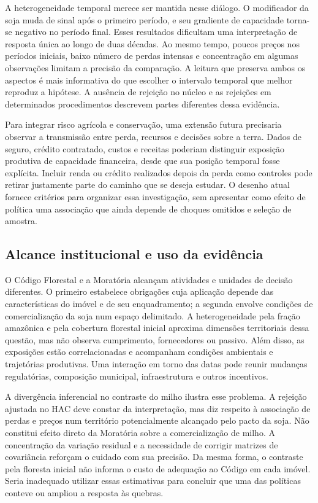 A heterogeneidade temporal merece ser mantida nesse diálogo. O modificador da soja muda de sinal após o primeiro período, e seu gradiente de capacidade torna-se negativo no período final. Esses resultados dificultam uma interpretação de resposta única ao longo de duas décadas. Ao mesmo tempo, poucos preços nos períodos iniciais, baixo número de perdas intensas e concentração em algumas observações limitam a precisão da comparação. A leitura que preserva ambos os aspectos é mais informativa do que escolher o intervalo temporal que melhor reproduz a hipótese. A ausência de rejeição no núcleo e as rejeições em determinados procedimentos descrevem partes diferentes dessa evidência.

Para integrar risco agrícola e conservação, uma extensão futura precisaria observar a transmissão entre perda, recursos e decisões sobre a terra. Dados de seguro, crédito contratado, custos e receitas poderiam distinguir exposição produtiva de capacidade financeira, desde que sua posição temporal fosse explícita. Incluir renda ou crédito realizados depois da perda como controles pode retirar justamente parte do caminho que se deseja estudar. O desenho atual fornece critérios para organizar essa investigação, sem apresentar como efeito de política uma associação que ainda depende de choques omitidos e seleção de amostra.

\subsection{Alcance institucional e uso da evidência}

O Código Florestal e a Moratória alcançam atividades e unidades de decisão diferentes. O primeiro estabelece obrigações cuja aplicação depende das características do imóvel e de seu enquadramento; a segunda envolve condições de comercialização da soja num espaço delimitado. A heterogeneidade pela fração amazônica e pela cobertura florestal inicial aproxima dimensões territoriais dessa questão, mas não observa cumprimento, fornecedores ou passivo. Além disso, as exposições estão correlacionadas e acompanham condições ambientais e trajetórias produtivas. Uma interação em torno das datas pode reunir mudanças regulatórias, composição municipal, infraestrutura e outros incentivos.

A divergência inferencial no contraste do milho ilustra esse problema. A rejeição ajustada no HAC deve constar da interpretação, mas diz respeito à associação de perdas e preços num território potencialmente alcançado pelo pacto da soja. Não constitui efeito direto da Moratória sobre a comercialização de milho. A concentração da variação residual e a necessidade de corrigir matrizes de covariância reforçam o cuidado com sua precisão. Da mesma forma, o contraste pela floresta inicial não informa o custo de adequação ao Código em cada imóvel. Seria inadequado utilizar essas estimativas para concluir que uma das políticas conteve ou ampliou a resposta às quebras.

